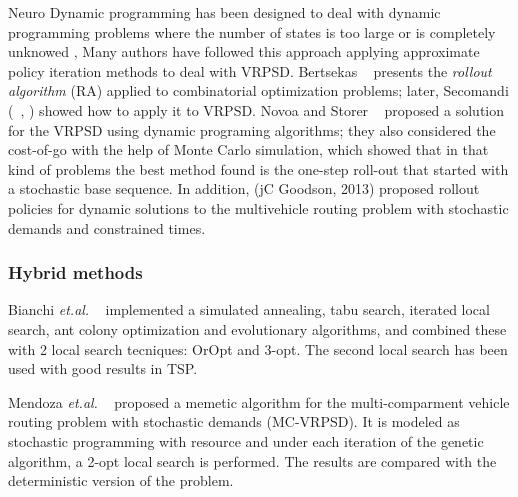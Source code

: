 Neuro Dynamic programming has been designed to deal with dynamic programming problems where the number of states is too large or is completely unknowed \cite{Bertsekas_1996}, Many authors have followed this approach applying approximate policy iteration methods to deal with VRPSD. 
Bertsekas ~\cite{Bertsekas1997} presents the \textit{rollout algorithm} (RA) applied to combinatorial optimization problems; later, Secomandi (~\cite{Secomandi_1998}, \cite{secomandi_rollout_2001}) showed how to apply it to VRPSD. Novoa and Storer ~\cite{novoa_approximate_2009} proposed a solution for the VRPSD using dynamic programing algorithms; they also considered the cost-of-go with the help of Monte Carlo simulation, which showed that in that kind of problems the best method found is the one-step roll-out that started with a stochastic base sequence. In addition, (jC Goodson, 2013) proposed rollout policies for dynamic solutions to the multivehicle routing problem with stochastic demands and constrained times.











\subsubsection{Hybrid methods}

Bianchi \textit{et.al.} ~\cite{bianchi_hybrid_2006} implemented a simulated annealing, tabu search, iterated local search, ant colony optimization and evolutionary algorithms, and combined these with 2 local search tecniques: OrOpt and 3-opt. The second local search has been used with good results in TSP.

Mendoza \textit{et.al.} ~\cite{mendoza_memetic_2010} proposed a memetic algorithm for the multi-comparment vehicle routing problem with stochastic demands (MC-VRPSD). It is modeled as stochastic programming with resource and under each iteration of the genetic algorithm, a 2-opt local search is performed. The results are compared with the deterministic version of the problem.

